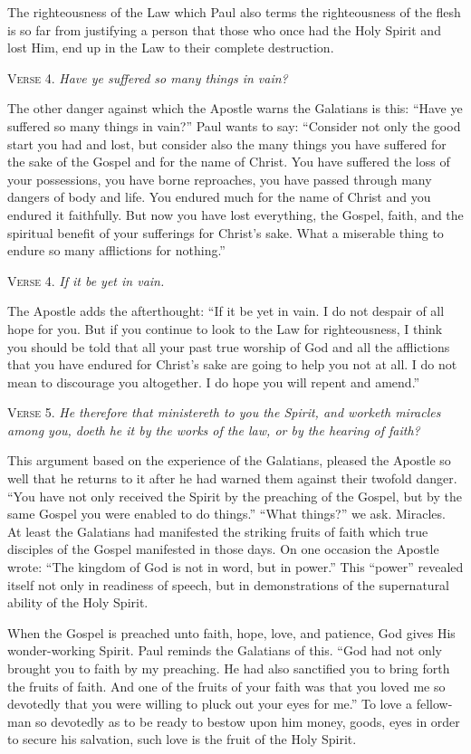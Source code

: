 The righteousness of the Law which Paul also terms the righteousness of the flesh is so far from justifying a person that those who once had the Holy Spirit and lost Him, end up in the Law to their complete destruction.

\textsc{Verse} 4. \emph{Have ye suffered so many things in vain?}

The other danger against which the Apostle warns the Galatians is this: “Have ye suffered so many things in vain?” Paul wants to say: “Consider not only the good start you had and lost, but consider also the many things you have suffered for the sake of the Gospel and for the name of Christ. You have suffered the loss of your possessions, you have borne reproaches, you have passed through many dangers of body and life. You endured much for the name of Christ and you endured it faithfully. But now you have lost everything, the Gospel, faith, and the spiritual benefit of your sufferings for Christ’s sake. What a miserable thing to endure so many afflictions for nothing.”

\textsc{Verse} 4. \emph{If it be yet in vain.}

The Apostle adds the afterthought: “If it be yet in vain. I do not despair of all hope for you. But if you continue to look to the Law for righteousness, I think you should be told that all your past true worship of God and all the afflictions that you have endured for Christ’s sake are going to help you not at all. I do not mean to discourage you altogether. I do hope you will repent and amend.”

\textsc{Verse} 5. \emph{He therefore that ministereth to you the Spirit, and worketh miracles among you, doeth he it by the works of the law, or by the hearing of faith?}

This argument based on the experience of the Galatians, pleased the Apostle so well that he returns to it after he had warned them against their twofold danger. “You have not only received the Spirit by the preaching of the Gospel, but by the same Gospel you were enabled to do things.” “What things?” we ask. Miracles. At least the Galatians had manifested the striking fruits of faith which true disciples of the Gospel manifested in those days. On one occasion the Apostle wrote: “The kingdom of God is not in word, but in power.” This “power” revealed itself not only in readiness of speech, but in demonstrations of the supernatural ability of the Holy Spirit.

When the Gospel is preached unto faith, hope, love, and patience, God gives His wonder-working Spirit. Paul reminds the Galatians of this. “God had not only brought you to faith by my preaching. He had also sanctified you to bring forth the fruits of faith. And one of the fruits of your faith was that you loved me so devotedly that you were willing to pluck out your eyes for me.” To love a fellow-man so devotedly as to be ready to bestow upon him money, goods, eyes in order to secure his salvation, such love is the fruit of the Holy Spirit.

